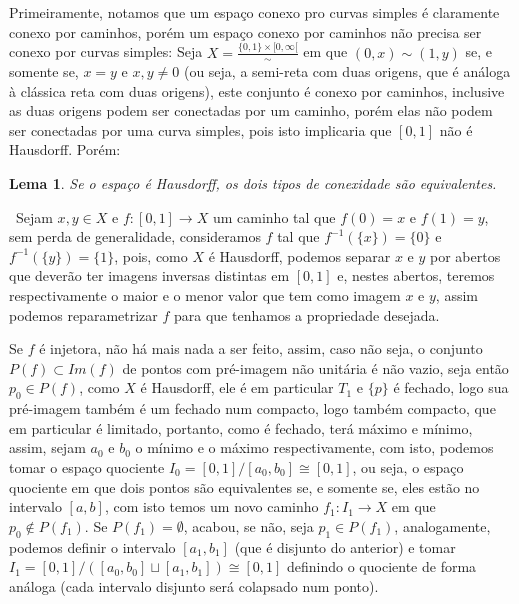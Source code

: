 \documentclass[12pt,a4paper]{article}
\newtheorem{lem}[mydef]{Lema}
\def\dem{\par\smallbreak\noindent {\textit{ Demonstração:}} \ }
\theoremstyle{definition}
\begin{document}
Primeiramente, notamos que um espaço conexo pro curvas simples é claramente conexo por caminhos, porém um espaço conexo por caminhos não precisa ser conexo por curvas simples: Seja $X=\frac{\{0,1\}\times [0,\infty[ }{ \sim} $ em que $(0,x)\sim (1,y)$ se, e somente se, $x=y$ e $x,y\neq 0$ (ou seja, a semi-reta com duas origens, que é análoga à clássica reta com duas origens), este conjunto é conexo por caminhos, inclusive as duas origens podem ser conectadas por um caminho, porém elas não podem ser conectadas por uma curva simples, pois isto implicaria que $[0,1]$ não é Hausdorff. Porém: 

\begin{lem}

    Se o espaço é Hausdorff, os dois tipos de conexidade são equivalentes. 

\end{lem}

\dem Sejam $x,y\in X$ e $f:[0,1]\rightarrow X$ um caminho tal que $f(0)=x$ e $f(1)=y$, sem perda de generalidade, consideramos $f$ tal que $f^{-1}(\{x\})=\{0\}$ e $f^{-1}(\{y\})=\{1\}$, pois, como $X$ é Hausdorff, podemos separar $x$ e $y$ por abertos que deverão ter imagens inversas distintas em $[0,1]$ e, nestes abertos, teremos respectivamente o maior e o menor valor que tem como imagem $x$ e $y$, assim podemos reparametrizar $f$ para que tenhamos a propriedade desejada. 

Se $f$ é injetora, não há mais nada a ser feito, assim, caso não seja, o conjunto $P(f)\subset Im(f)$ de pontos com pré-imagem não unitária é não vazio, seja então $p_0\in P(f)$, como $X$ é Hausdorff, ele é em particular $T_1$ e $\{p\}$ é fechado, logo sua pré-imagem também é um fechado num compacto, logo também compacto, que em particular é limitado, portanto, como é fechado, terá máximo e mínimo, assim, sejam $a_0$ e $b_0$ o mínimo e o máximo respectivamente, com isto, podemos tomar o espaço quociente $I_0=[0,1]/[a_0,b_0]\cong [0,1]$, ou seja, o espaço quociente em que dois pontos são equivalentes se, e somente se, eles estão no intervalo $[a,b]$, com isto temos um novo caminho $f_1:I_1\rightarrow X$ em que $p_0\notin P(f_1)$. Se $ P(f_1)=\emptyset$, acabou, se não, seja $p_1\in P(f_1)$, analogamente, podemos definir o intervalo $[a_1,b_1]$ (que é disjunto do anterior) e tomar $I_1=[0,1]/([a_0,b_0]\sqcup [a_1,b_1])\cong [0,1]$ definindo o quociente de forma análoga (cada intervalo disjunto será colapsado num ponto). 
\end{document}
